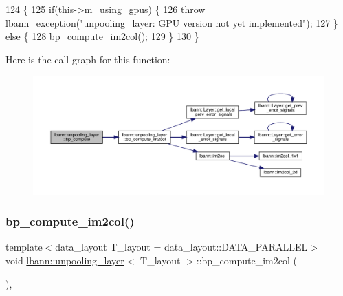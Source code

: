 \begin{DoxyCode}
124                              \{
125     \textcolor{keywordflow}{if}(this->\hyperlink{classlbann_1_1Layer_af7881cb5eff5207c15fa835d65462e8f}{m\_using\_gpus}) \{
126       \textcolor{keywordflow}{throw} lbann\_exception(\textcolor{stringliteral}{"unpooling\_layer: GPU version not yet implemented"});
127     \} \textcolor{keywordflow}{else} \{
128       \hyperlink{classlbann_1_1unpooling__layer_ad4607102ff59de2f233a87f13967cc04}{bp\_compute\_im2col}();
129     \}
130   \}
\end{DoxyCode}
Here is the call graph for this function\+:\nopagebreak
\begin{figure}[H]
\begin{center}
\leavevmode
\includegraphics[width=350pt]{classlbann_1_1unpooling__layer_ad585e8ddaa34c221fa8e4d108c8950ae_cgraph}
\end{center}
\end{figure}
\mbox{\label{classlbann_1_1unpooling__layer_ad4607102ff59de2f233a87f13967cc04}} 
\subsubsection{\texorpdfstring{bp\+\_\+compute\+\_\+im2col()}{bp\_compute\_im2col()}}
{\footnotesize\ttfamily template$<$data\+\_\+layout T\+\_\+layout = data\+\_\+layout\+::\+D\+A\+T\+A\+\_\+\+P\+A\+R\+A\+L\+L\+EL$>$ \\
void \hyperlink{classlbann_1_1unpooling__layer}{lbann\+::unpooling\+\_\+layer}$<$ T\+\_\+layout $>$\+::bp\+\_\+compute\+\_\+im2col (\begin{DoxyParamCaption}{ }\end{DoxyParamCaption})\hspace{0.3cm}{\ttfamily [inline]}, {\ttfamily [private]}}



